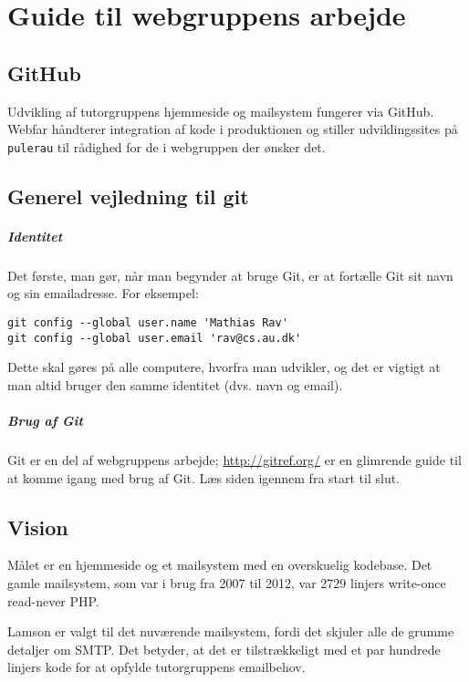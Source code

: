 \documentclass[article,oneside,a4paper]{memoir}
\newcommand{\pulerau}{\texttt{pulerau}\xspace}
\begin{document}
\chapter{Guide til webgruppens arbejde}

\section{GitHub}

Udvikling af tutorgruppens hjemmeside og mailsystem fungerer via GitHub. Webfar
håndterer integration af kode i produktionen og stiller udviklingssites på
\pulerau til rådighed for de i webgruppen der ønsker det.

\section{Generel vejledning til git}

\paragraph{Identitet}
Det første, man gør, når man begynder at bruge Git, er at fortælle Git sit navn
og sin emailadresse. For eksempel:
\begin{lstlisting}
git config --global user.name 'Mathias Rav'
git config --global user.email 'rav@cs.au.dk'
\end{lstlisting}
Dette skal gøres på alle computere, hvorfra man udvikler, og det er vigtigt at
man altid bruger den samme identitet (dvs. navn og email).

\paragraph{Brug af Git}
Git er en del af webgruppens arbejde; \url{http://gitref.org/} er en glimrende
guide til at komme igang med brug af Git. Læs siden igennem fra start til slut.

\section{Vision}

Målet er en hjemmeside og et mailsystem med en overskuelig kodebase.
Det gamle mailsystem, som var i brug fra 2007 til 2012, var 2729 linjers
write-once read-never PHP.

Lamson er valgt til det nuværende mailsystem, fordi det skjuler alle de grumme
detaljer om SMTP.  Det betyder, at det er tilstrækkeligt med et par hundrede
linjers kode for at opfylde tutorgruppens emailbehov.
\end{document}
